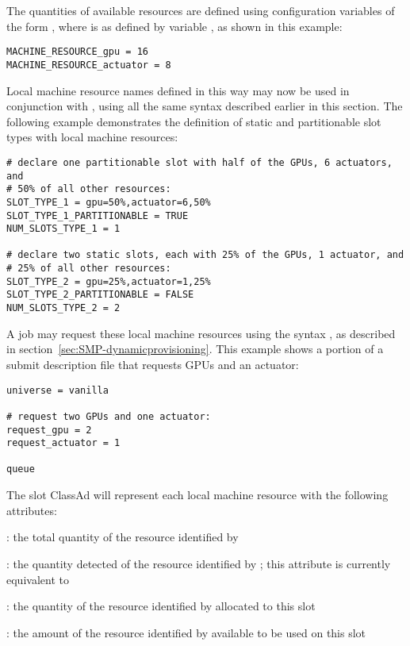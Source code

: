 The quantities of available resources are defined using configuration
variables of the form ,
where  is as defined by variable 
, as shown in this example:
\begin{verbatim}
MACHINE_RESOURCE_gpu = 16
MACHINE_RESOURCE_actuator = 8
\end{verbatim}

Local machine resource names defined in this way may now be used in conjunction 
with , using all the same syntax described
earlier in this section.
The following example demonstrates
the definition of static and partitionable slot types with local machine 
resources:
\begin{verbatim}
# declare one partitionable slot with half of the GPUs, 6 actuators, and
# 50% of all other resources:
SLOT_TYPE_1 = gpu=50%,actuator=6,50%
SLOT_TYPE_1_PARTITIONABLE = TRUE
NUM_SLOTS_TYPE_1 = 1

# declare two static slots, each with 25% of the GPUs, 1 actuator, and
# 25% of all other resources: 
SLOT_TYPE_2 = gpu=25%,actuator=1,25%
SLOT_TYPE_2_PARTITIONABLE = FALSE
NUM_SLOTS_TYPE_2 = 2
\end{verbatim}

A job may request these local machine resources using the 
syntax , 
as described in section~\ref{sec:SMP-dynamicprovisioning}.  
This example shows a portion of a submit description file 
that requests GPUs and an actuator:
\begin{verbatim}
universe = vanilla

# request two GPUs and one actuator:
request_gpu = 2
request_actuator = 1

queue
\end{verbatim}

The slot ClassAd will represent each local machine resource
with the following attributes:
\begin{description}
\item{: the total quantity of the resource 
  identified by }
\item{: the quantity detected of the resource
  identified by ; this attribute is
  currently equivalent to }
\item{: the quantity of the resource
  identified by  allocated to this slot}
\item{: the amount of the resource
  identified by  available to be used on this slot}
\end{description}

